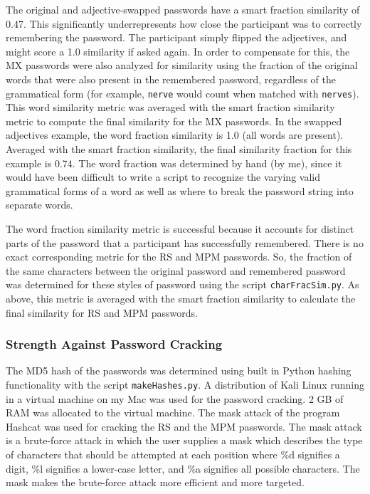 \documentclass{article}
\begin{document}
The original and adjective-swapped passwords have a smart fraction similarity of 0.47. This significantly underrepresents how close the participant was to correctly remembering the password. The participant simply flipped the adjectives, and might score a 1.0 similarity if asked again. In order to compensate for this, the MX passwords were also analyzed for similarity using the fraction of the original words that were also present in the remembered password, regardless of the grammatical form (for example, \texttt{nerve} would count when matched with \texttt{nerves}). This word similarity metric was averaged with the smart fraction similarity metric to compute the final similarity for the MX passwords. In the swapped adjectives example, the word fraction similarity is 1.0 (all words are present). Averaged with the smart fraction similarity, the final similarity fraction for this example is 0.74. The word fraction was determined by hand (by me), since it would have been difficult to write a script to recognize the varying valid grammatical forms of a word as well as where to break the password string into separate words.

The word fraction similarity metric is successful because it accounts for distinct parts of the password that a participant has successfully remembered. There is no exact corresponding metric for the RS and MPM passwords. So, the fraction of the same characters between the original password and remembered password was determined for these styles of password using the script \texttt{charFracSim.py}. As above, this metric is averaged with the smart fraction similarity to calculate the final similarity for RS and MPM passwords.


\subsubsection*{Strength Against Password Cracking}
The MD5 hash of the passwords was determined using built in Python hashing functionality with the script \texttt{makeHashes.py}. A distribution of Kali Linux running in a virtual machine on my Mac was used for the password cracking. 2 GB of RAM was allocated to the virtual machine. The mask attack of the program Hashcat \cite{hashcat} was used for cracking the RS and the MPM passwords. The mask attack is a brute-force attack in which the user supplies a mask which describes the type of characters that should be attempted at each position where \%d signifies a digit, \%l signifies a lower-case letter, and \%a signifies all possible characters. The mask makes the brute-force attack more efficient and more targeted.
\end{document}
